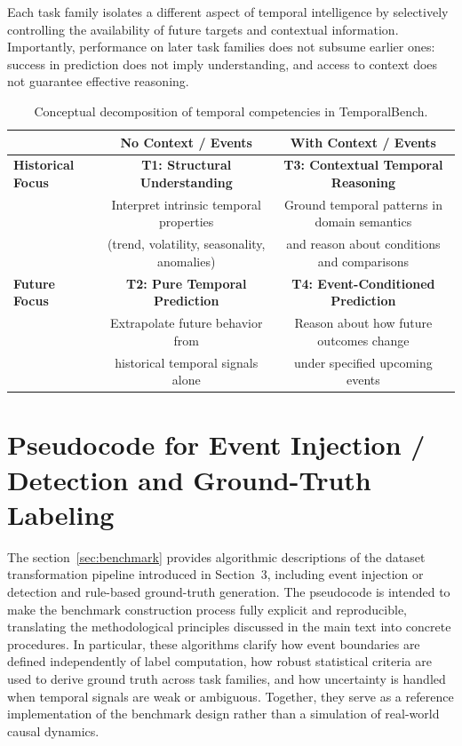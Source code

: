 Each task family isolates a different aspect of temporal intelligence by selectively controlling the availability of future targets and contextual information.
Importantly, performance on later task families does not subsume earlier ones: success in prediction does not imply understanding, and access to context does not guarantee effective reasoning.



\begin{table}[htbp]
\centering
\caption{Conceptual decomposition of temporal competencies in TemporalBench.}
\label{tab:task_families}
\begin{tabular}{lcc}
\toprule
 & \textbf{No Context / Events} & \textbf{With Context / Events} \\
\midrule
\textbf{Historical Focus} &
\textbf{T1: Structural Understanding} &
\textbf{T3: Contextual Temporal Reasoning} \\
 &
Interpret intrinsic temporal properties &
Ground temporal patterns in domain semantics \\
 &
(trend, volatility, seasonality, anomalies) &
and reason about conditions and comparisons \\
\midrule
\textbf{Future Focus} &
\textbf{T2: Pure Temporal Prediction} &
\textbf{T4: Event-Conditioned Prediction} \\
 &
Extrapolate future behavior from &
Reason about how future outcomes change \\
 &
historical temporal signals alone &
under specified upcoming events \\
\bottomrule
\end{tabular}
\end{table}






\section{ Pseudocode for Event Injection / Detection and Ground-Truth Labeling}
\label{app:pseudocode}


The section~\ref{sec:benchmark} provides algorithmic descriptions of the dataset transformation pipeline introduced in Section~3, including event injection or detection and rule-based ground-truth generation.
The pseudocode is intended to make the benchmark construction process fully explicit and reproducible, translating the methodological principles discussed in the main text into concrete procedures.
In particular, these algorithms clarify how event boundaries are defined independently of label computation, how robust statistical criteria are used to derive ground truth across task families, and how uncertainty is handled when temporal signals are weak or ambiguous.
Together, they serve as a reference implementation of the benchmark design rather than a simulation of real-world causal dynamics.


